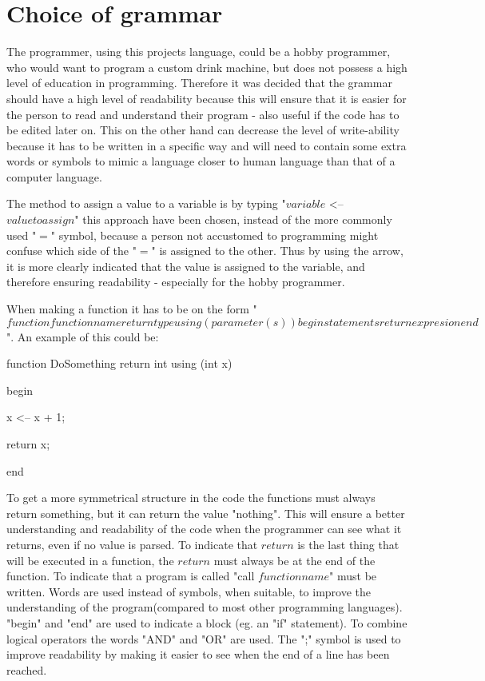 \section{Choice of grammar}
\label{sec:grammachoice}
The programmer, using this projects language, could be a hobby programmer, who would want to program a custom drink machine, but does not possess a high level of education in programming. Therefore it was decided that the grammar should have a high level of readability because this will ensure that it is easier for the person to read and understand their program - also useful if the code has to be edited later on. This on the other hand can decrease the level of write-ability because it has to be written in a specific way and will need to contain some extra words or symbols to mimic a language closer to human language than that of a computer language.


The method to assign a value to a variable is by typing "$variable$ <-- $value to assign$" this approach have been chosen, instead of the more commonly used "$=$" symbol, because a person not accustomed to programming might confuse which side of the "$=$" is assigned to the other. Thus by using the arrow, it is more clearly indicated that the value is assigned to the variable, and therefore ensuring readability - especially for the hobby programmer.

When making a function it has to be on the form "$function functionname return type using (parameter(s)) begin statements return expresion end$". 
An example of this could be:

function DoSomething return int using (int x)

begin

x <-- x + 1;

return x;

end

To get a more symmetrical structure in the code the functions must always return something, but it can return the value "nothing". This will ensure a better understanding and readability of the code when the programmer can see what it returns, even if no value is parsed. To indicate that $return$ is the last thing that will be executed in a function, the $return$ must always be at the end of the function. To indicate that a program is called "call $functionname$" must be written.
Words are used instead of symbols, when suitable, to improve the understanding of the program(compared to most other programming languages).
"begin" and "end" are used to indicate a block (eg. an "if" statement). To combine logical operators the words "AND" and "OR" are used. The ";" symbol is used to improve readability by making it easier to see when the end of a line has been reached.

